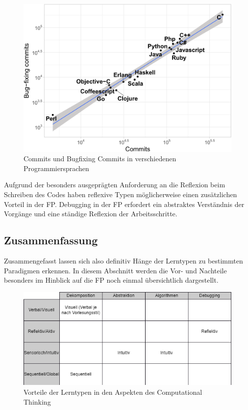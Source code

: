 \begin{figure}[H]
    \centering
    \includegraphics[width=1\linewidth]{Figures/Section_3/FigBugCommitsFP}
    \caption{Commits und Bugfixing Commits in verschiedenen Programmiersprachen \protect\cite{berger}}
\end{figure}

Aufgrund der besonders ausgeprägten Anforderung an die Reflexion beim Schreiben des Codes haben reflexive Typen möglicherweise einen zusätzlichen Vorteil in der FP.
Debugging in der FP erfordert ein abstraktes Verständnis der Vorgänge und eine ständige Reflexion der Arbeitsschritte.

\subsection{Zusammenfassung}
Zusammengefasst lassen sich also definitiv Hänge der Lerntypen zu bestimmten Paradigmen erkennen. In diesem Abschnitt werden die Vor- und Nachteile besonders im Hinblick auf die FP noch einmal übersichtlich dargestellt.

\begin{figure}[H]
    \centering
    \includegraphics[width=1\linewidth]{Figures/Section_3/Styles_CT}
    \caption{Vorteile der Lerntypen in den Aspekten des Computational Thinking}
\end{figure}

